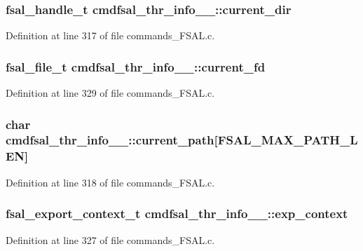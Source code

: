 \subsubsection[{current\_\-dir}]{\setlength{\rightskip}{0pt plus 5cm}fsal\_\-handle\_\-t {\bf cmdfsal\_\-thr\_\-info\_\-\_\-::current\_\-dir}}\label{structcmdfsal__thr__info_____55cab2404e5c9bdf229b636dc0b2071a}




Definition at line 317 of file commands\_\-FSAL.c.
\subsubsection[{current\_\-fd}]{\setlength{\rightskip}{0pt plus 5cm}fsal\_\-file\_\-t {\bf cmdfsal\_\-thr\_\-info\_\-\_\-::current\_\-fd}}\label{structcmdfsal__thr__info_____a33b996288139b99011f72aa56d832c6}




Definition at line 329 of file commands\_\-FSAL.c.
\subsubsection[{current\_\-path}]{\setlength{\rightskip}{0pt plus 5cm}char {\bf cmdfsal\_\-thr\_\-info\_\-\_\-::current\_\-path}[FSAL\_\-MAX\_\-PATH\_\-LEN]}\label{structcmdfsal__thr__info_____9e3954e6a0053bc87c8aa39481ca4313}




Definition at line 318 of file commands\_\-FSAL.c.
\subsubsection[{exp\_\-context}]{\setlength{\rightskip}{0pt plus 5cm}fsal\_\-export\_\-context\_\-t {\bf cmdfsal\_\-thr\_\-info\_\-\_\-::exp\_\-context}}\label{structcmdfsal__thr__info_____46c313f34b68fb57a05c80adcb178c64}




Definition at line 327 of file commands\_\-FSAL.c.
